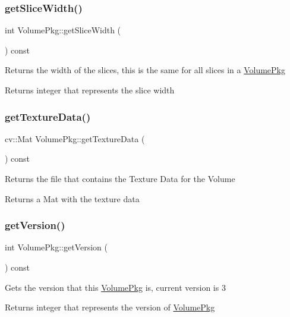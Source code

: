 \subsubsection{\texorpdfstring{get\+Slice\+Width()}{getSliceWidth()}}
{\footnotesize\ttfamily int Volume\+Pkg\+::get\+Slice\+Width (\begin{DoxyParamCaption}{ }\end{DoxyParamCaption}) const}

Returns the width of the slices, this is the same for all slices in a \hyperlink{classVolumePkg}{Volume\+Pkg} \begin{DoxyReturn}{Returns}
integer that represents the slice width 
\end{DoxyReturn}
\hypertarget{classVolumePkg_abb42726353738af10e922d0ef41406d6}{}\label{classVolumePkg_abb42726353738af10e922d0ef41406d6} 
\subsubsection{\texorpdfstring{get\+Texture\+Data()}{getTextureData()}}
{\footnotesize\ttfamily cv\+::\+Mat Volume\+Pkg\+::get\+Texture\+Data (\begin{DoxyParamCaption}{ }\end{DoxyParamCaption}) const}

Returns the file that contains the Texture Data for the Volume \begin{DoxyReturn}{Returns}
a Mat with the texture data 
\end{DoxyReturn}
\hypertarget{classVolumePkg_a2a0e7f720aab28e7c67e22fc37051c0c}{}\label{classVolumePkg_a2a0e7f720aab28e7c67e22fc37051c0c} 
\subsubsection{\texorpdfstring{get\+Version()}{getVersion()}}
{\footnotesize\ttfamily int Volume\+Pkg\+::get\+Version (\begin{DoxyParamCaption}{ }\end{DoxyParamCaption}) const}

Gets the version that this \hyperlink{classVolumePkg}{Volume\+Pkg} is, current version is 3 \begin{DoxyReturn}{Returns}
integer that represents the version of \hyperlink{classVolumePkg}{Volume\+Pkg} 
\end{DoxyReturn}
\hypertarget{classVolumePkg_a0fb419c7902913a8b98fb5aafb90685e}{}\label{classVolumePkg_a0fb419c7902913a8b98fb5aafb90685e} 
